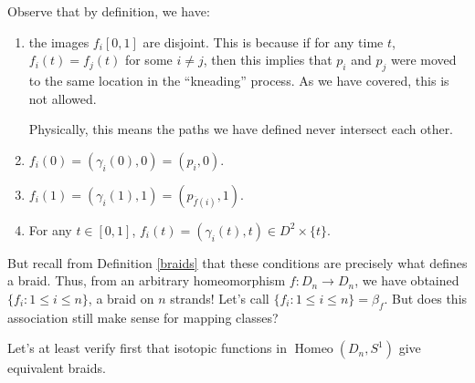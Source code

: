 \documentclass{amsart}
\DeclareMathOperator{\Homeo}{Homeo}
\begin{document}
Observe that by definition, we have:
\begin{enumerate}[label=(\roman*)]
	\item the images \(f_i[0, 1]\) are disjoint. This is because if for any time
	\(t\), \(f_i(t) = f_j(t)\) for some \(i\ne j\), then this implies that
	\(p_i\) and \(p_j\) were moved to the same location in the ``kneading''
	process. As we have covered, this is not allowed. 

	Physically, this means the paths we have defined never intersect each other.
	\item \(f_i(0) = (\gamma_i(0), 0) = (p_i, 0)\).
	\item \(f_i(1) = (\gamma_i(1), 1) = (p_{\overline{f}(i)}, 1)\).
	\item For any \(t\in[0, 1]\), \(f_i(t) = (\gamma_i(t), t)\in
	D^2\times\{t\}\).
\end{enumerate}
But recall from Definition \ref{braids} that these conditions are precisely
what defines a braid. Thus, from an arbitrary homeomorphism \(f: D_n\to D_n\),
we have obtained \(\{f_i: 1\le i\le n\}\), a braid on \(n\) strands! Let's call
\(\{f_i: 1\le i\le n\} = \beta_f\). But does this association still make sense
for mapping classes?

Let's at least verify first that isotopic functions in \(\Homeo(D_n, S^1)\)
give equivalent braids.
\end{document}
